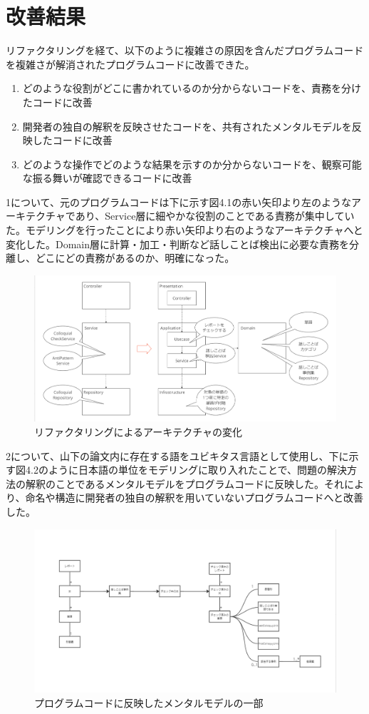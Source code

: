 \documentclass[11pt, a4paper]{jreport}
\begin{document}
\section{改善結果}
リファクタリングを経て、以下のように複雑さの原因を含んだプログラムコードを複雑さが解消されたプログラムコードに改善できた。
\begin{enumerate}
\item どのような役割がどこに書かれているのか分からないコードを、責務を分けたコードに改善
\item 開発者の独自の解釈を反映させたコードを、共有されたメンタルモデルを反映したコードに改善
\item どのような操作でどのような結果を示すのか分からないコードを、観察可能な振る舞いが確認できるコードに改善
\end{enumerate}
1について、元のプログラムコードは下に示す図4.1の赤い矢印より左のようなアーキテクチャであり、Service層に細やかな役割のことである責務が集中していた。モデリングを行ったことにより赤い矢印より右のようなアーキテクチャへと変化した。Domain層に計算・加工・判断など話しことば検出に必要な責務を分離し、どこにどの責務があるのか、明確になった。
\begin{figure}[H]
\centering
\includegraphics[width=1\linewidth]{image/kaizen1.png}
\caption{リファクタリングによるアーキテクチャの変化}
\label{fig:enter-label}
\end{figure}
2について、山下の論文内に存在する語をユビキタス言語として使用し、下に示す図4.2のように日本語の単位をモデリングに取り入れたことで、問題の解決方法の解釈のことであるメンタルモデルをプログラムコードに反映した。それにより、命名や構造に開発者の独自の解釈を用いていないプログラムコードへと改善した。
\begin{figure}[H]
\centering
\includegraphics[width=1\linewidth]{image/kaizen2.png}
\caption{プログラムコードに反映したメンタルモデルの一部}
\label{fig:enter-label}
\end{figure}
\end{document}

